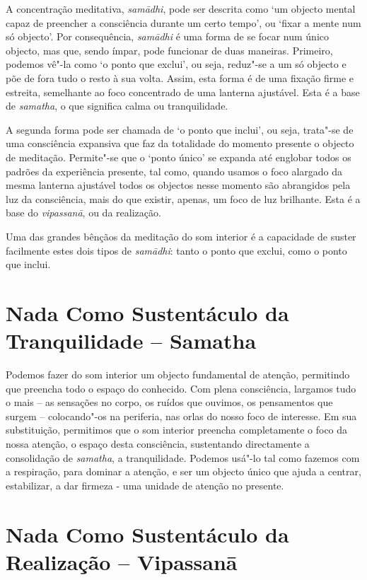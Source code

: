 A concentração meditativa, \emph{samādhi}, pode ser descrita como `um
objecto mental capaz de preencher a consciência durante um certo tempo',
ou `fixar a mente num só objecto'. Por consequência, \emph{samādhi} é
uma forma de se focar num único objecto, mas que, sendo ímpar, pode
funcionar de duas maneiras. Primeiro, podemos vê"-la como `o ponto que
exclui', ou seja, reduz"-se a um só objecto e põe de fora tudo o resto à
sua volta. Assim, esta forma é de uma fixação firme e estreita,
semelhante ao foco concentrado de uma lanterna ajustável. Esta é a base
de \emph{samatha}, o que significa calma ou tranquilidade.

A segunda forma pode ser chamada de `o ponto que inclui', ou seja,
trata"-se de uma consciência expansiva que faz da totalidade do momento
presente o objecto de meditação. Permite"-se que o `ponto único' se
expanda até englobar todos os padrões da experiência presente, tal como,
quando usamos o foco alargado da mesma lanterna ajustável todos os
objectos nesse momento são abrangidos pela luz da consciência, mais do
que existir, apenas, um foco de luz brilhante. Esta é a base do
\emph{vipassanā}, ou da realização.

Uma das grandes bênçãos da meditação do som interior é a capacidade de
suster facilmente estes dois tipos de \emph{samādhi}: tanto o ponto que
exclui, como o ponto que inclui.

\section{Nada Como Sustentáculo da Tranquilidade -- Samatha}

Podemos fazer do som interior um objecto fundamental de atenção,
permitindo que preencha todo o espaço do conhecido. Com plena
consciência, largamos tudo o mais -- as sensações no corpo, os ruídos
que ouvimos, os pensamentos que surgem -- colocando"-os na periferia, nas
orlas do nosso foco de interesse. Em sua substituição, permitimos que o
som interior preencha completamente o foco da nossa atenção, o espaço
desta consciência, sustentando directamente a consolidação de
\emph{samatha}, a tranquilidade. Podemos usá"-lo tal como fazemos com a
respiração, para dominar a atenção, e ser um objecto único que ajuda a
centrar, estabilizar, a dar firmeza - uma unidade de atenção no
presente.

\section{Nada Como Sustentáculo da Realização -- Vipassanā}

